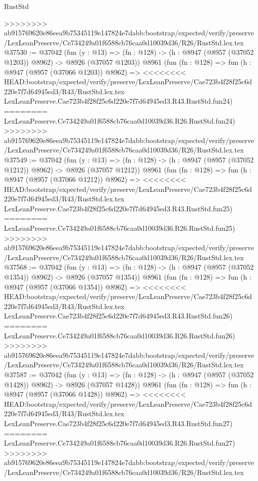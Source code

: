 \begin{lexlean}{RustStd}
\begin{coremodule}
{\begin{coremodule}
{{{{{{{{{{{{{{{{{{{{{{{{{{{{{{{{{{{{{{{>>>>>>>> ab915769620e86eea9b75345119e147824e7dabb:bootstrap/expected/verify/preserve/LexLeanPreserve/Ce734249a01f6588cb76caa0d10039d36/R26/RustStd.lex.tex
@37530 := @37042
    (fun (y : @13) =>
    (fn : @128) -> (h : @8947 (@8957 (@37052 @1203)) @8962) -> @8926 (@37057 @1203))
    @8961
    (fun (fn : @128) =>
    fun (h : @8947 (@8957 (@37066 @1203)) @8962) =>
<<<<<<<< HEAD:bootstrap/expected/verify/preserve/LexLeanPreserve/Cae723b4f28f25c6d220e7f7d64945ed3/R43/RustStd.lex.tex
    LexLeanPreserve.Cae723b4f28f25c6d220e7f7d64945ed3.R43.RustStd.fun24)
========
    LexLeanPreserve.Ce734249a01f6588cb76caa0d10039d36.R26.RustStd.fun24)
>>>>>>>> ab915769620e86eea9b75345119e147824e7dabb:bootstrap/expected/verify/preserve/LexLeanPreserve/Ce734249a01f6588cb76caa0d10039d36/R26/RustStd.lex.tex
@37549 := @37042
    (fun (y : @13) =>
    (fn : @128) -> (h : @8947 (@8957 (@37052 @1212)) @8962) -> @8926 (@37057 @1212))
    @8961
    (fun (fn : @128) =>
    fun (h : @8947 (@8957 (@37066 @1212)) @8962) =>
<<<<<<<< HEAD:bootstrap/expected/verify/preserve/LexLeanPreserve/Cae723b4f28f25c6d220e7f7d64945ed3/R43/RustStd.lex.tex
    LexLeanPreserve.Cae723b4f28f25c6d220e7f7d64945ed3.R43.RustStd.fun25)
========
    LexLeanPreserve.Ce734249a01f6588cb76caa0d10039d36.R26.RustStd.fun25)
>>>>>>>> ab915769620e86eea9b75345119e147824e7dabb:bootstrap/expected/verify/preserve/LexLeanPreserve/Ce734249a01f6588cb76caa0d10039d36/R26/RustStd.lex.tex
@37568 := @37042
    (fun (y : @13) =>
    (fn : @128) -> (h : @8947 (@8957 (@37052 @1354)) @8962) -> @8926 (@37057 @1354))
    @8961
    (fun (fn : @128) =>
    fun (h : @8947 (@8957 (@37066 @1354)) @8962) =>
<<<<<<<< HEAD:bootstrap/expected/verify/preserve/LexLeanPreserve/Cae723b4f28f25c6d220e7f7d64945ed3/R43/RustStd.lex.tex
    LexLeanPreserve.Cae723b4f28f25c6d220e7f7d64945ed3.R43.RustStd.fun26)
========
    LexLeanPreserve.Ce734249a01f6588cb76caa0d10039d36.R26.RustStd.fun26)
>>>>>>>> ab915769620e86eea9b75345119e147824e7dabb:bootstrap/expected/verify/preserve/LexLeanPreserve/Ce734249a01f6588cb76caa0d10039d36/R26/RustStd.lex.tex
@37587 := @37042
    (fun (y : @13) =>
    (fn : @128) -> (h : @8947 (@8957 (@37052 @1428)) @8962) -> @8926 (@37057 @1428))
    @8961
    (fun (fn : @128) =>
    fun (h : @8947 (@8957 (@37066 @1428)) @8962) =>
<<<<<<<< HEAD:bootstrap/expected/verify/preserve/LexLeanPreserve/Cae723b4f28f25c6d220e7f7d64945ed3/R43/RustStd.lex.tex
    LexLeanPreserve.Cae723b4f28f25c6d220e7f7d64945ed3.R43.RustStd.fun27)
========
    LexLeanPreserve.Ce734249a01f6588cb76caa0d10039d36.R26.RustStd.fun27)
>>>>>>>> ab915769620e86eea9b75345119e147824e7dabb:bootstrap/expected/verify/preserve/LexLeanPreserve/Ce734249a01f6588cb76caa0d10039d36/R26/RustStd.lex.tex
}}}}}}}}}}}}}}}}}}}}}}}}}}}}}}}}}}}}}}}
\end{coremodule}}
\end{coremodule}
\end{lexlean}
